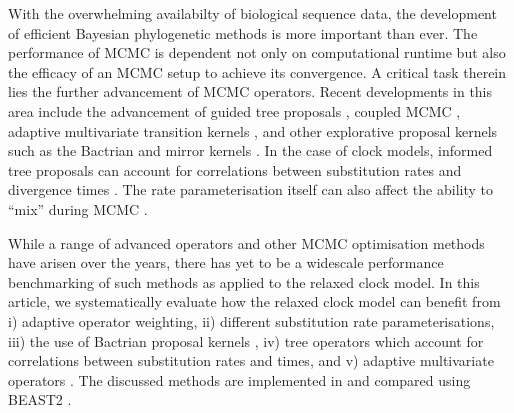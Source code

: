 \documentclass[10pt,letterpaper]{article}
\begin{document}
With the overwhelming availabilty of biological sequence data, the development of efficient Bayesian phylogenetic methods is more important than ever. 
The performance of MCMC is dependent not only on computational runtime but also the efficacy of an
MCMC setup to achieve its convergence.
A critical task therein lies the further advancement of MCMC operators.
Recent developments in this area include the advancement of guided tree proposals \cite{zhang2020using, meyer2019adaptive, hohna2012guided}, coupled MCMC \cite{altekar2004parallel, muller2019coupled},
adaptive multivariate transition kernels \cite{baele2017adaptive},
and other explorative proposal kernels such as the Bactrian and mirror kernels \cite{yang2013searching, thawornwattana2018designing}.
In the case of clock models, informed tree proposals can account for correlations between substitution rates and divergence times \cite{zhang2020improving}. 
The rate parameterisation itself can also affect the ability to ``mix'' during MCMC \cite{drummond2006relaxed, li2012model, zhang2020improving}. 




While a range of advanced operators and other MCMC optimisation methods have arisen over the years, there has yet to be a widescale performance benchmarking of such methods as applied to the relaxed clock model. 
In this article, we systematically evaluate how the relaxed clock model can benefit from i) adaptive operator weighting, ii) different substitution rate parameterisations,  iii) the use of Bactrian proposal kernels \cite{yang2013searching}, iv) tree operators which account for correlations between substitution rates and times, and v) adaptive multivariate operators \cite{baele2017adaptive}.
The discussed methods are implemented in and compared using BEAST2 \cite{bouckaert2019beast}. 




\end{document}
